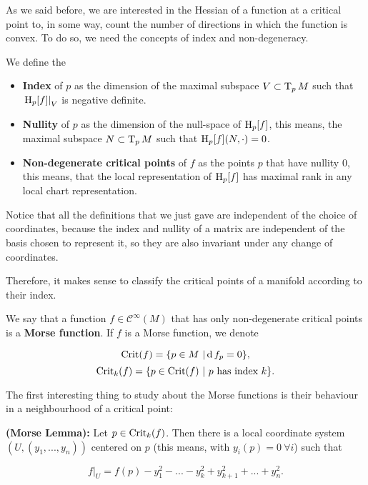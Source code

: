 As we said before, we are interested in the Hessian of a function at a critical point to, in some way, count the number of directions in which the function is convex. To do so, we need the concepts of index and non-degeneracy.

\begin{deff}
	We define the

\begin{itemize}
	\item {\bf Index} of $p$ as the dimension of the maximal subspace $V \subset \operatorname T_pM$ such that $\left. \operatorname H_p[f] \right|_V$ is negative definite.
	\item {\bf Nullity} of $p$ as the dimension of the null-space of $\operatorname H_p[f]$, this means, the maximal subspace $N \subset \operatorname T_pM$ such that $\operatorname H_p[f](N,\cdot) = 0$.
	\item {\bf Non-degenerate critical points} of $f$ as the points $p$ that have nullity $0$, this means, that the local representation of $\operatorname H_p[f]$ has maximal rank in any local chart representation.
\end{itemize}
\end{deff}

Notice that all the definitions that we just gave are independent of the choice of coordinates, because the index and nullity of a matrix are independent of the basis chosen to represent it, so they are also invariant under any change of coordinates.

Therefore, it makes sense to classify the critical points of a manifold according to their index.

\begin{deff}
	We say that a function $f \in \mathcal{C}^{\infty}(M)$ that has only non-degenerate critical points is a {\bf Morse function}.
	If $f$ is a Morse function, we denote

	\begin{displaymath}
		\text{Crit}(f) = \{ p \in M \ | \operatorname d f_p = 0 \} ,
	\end{displaymath}
	\begin{displaymath}
		\crit_k(f) = \{p \in \crit(f) \ | \text{ $p$ has index $k$}\} .
	\end{displaymath}
\end{deff}

The first interesting thing to study about the Morse functions is their behaviour in a neighbourhood of a critical point:

\begin{prop}
	{\bf (Morse Lemma):} Let $p \in \text{Crit}_k(f)$. Then there is a local coordinate system $(U,(y_1,...,y_n))$ centered on $p$ (this means, with $y_i(p) = 0 \ \forall i$) such that

$$\left. f \right|_U = f(p) - y_1^2 - ... - y_k^2 + y_{k+1}^2 + ... + y_n^2 .$$
\end{prop}

